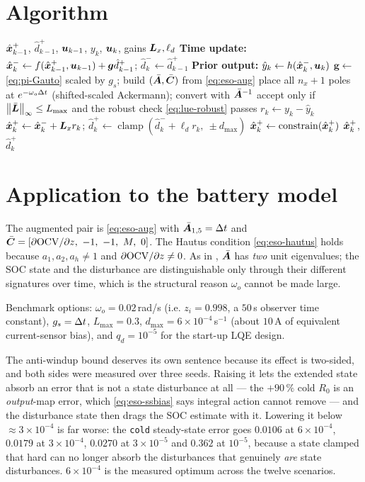 \section{Algorithm}
\begin{algorithm}[H]
\caption{ESO --- one sampling period}
\begin{algorithmic}[1]
\Require $\hat{\bm{x}}^{+}_{k-1}$, $\hat{d}^+_{k-1}$, $\bm{u}_{k-1}$, $y_k$, $\bm{u}_k$, gains $\bm{L}_x,\ell_d$
\State \textbf{Time update:} $\hat{\bm{x}}^{-}_k \gets f(\hat{\bm{x}}^{+}_{k-1},\bm{u}_{k-1}) + \bm{g}\hat{d}^+_{k-1}$; \quad $\hat{d}^-_k \gets \hat{d}^+_{k-1}$
\State \textbf{Prior output:} $\hat{y}_k \gets h(\hat{\bm{x}}^{-}_k,\bm{u}_k)$
  \State $\bm{g}\gets$ \eqref{eq:pi-Gauto} scaled by $g_s$; build $(\bar{\bm{A}},\bar{\bm{C}})$ from \eqref{eq:eso-aug}
  \State place all $n_x+1$ poles at $e^{-\omega_o\Delta t}$ (shifted-scaled Ackermann); convert with $\bar{\bm{A}}^{-1}$
  \State accept only if $\left\lVert \bar{\bm{L}} \right\rVert_\infty\le L_{\max}$ and the robust check \eqref{eq:lue-robust} passes
\EndIf
\State $r_k \gets y_k - \hat{y}_k$
\State $\hat{\bm{x}}^{+}_k \gets \hat{\bm{x}}^{-}_k + \bm{L}_x r_k$; \quad $\hat{d}^+_k \gets \operatorname{clamp}(\hat{d}^-_k + \ell_d r_k,\ \pm d_{\max})$
\State $\hat{\bm{x}}^{+}_k \gets \operatorname{constrain}(\hat{\bm{x}}^{+}_k)$
\Ensure $\hat{\bm{x}}^{+}_k$, $\hat{d}^+_k$
\end{algorithmic}
\end{algorithm}

\section{Application to the battery model}
The augmented pair is \eqref{eq:eso-aug} with
$\bar{\bm{A}}_{1,5} = \Delta t$ and $\bar{\mC} = [\partial\ocv/\partial\soc,\ -1,\ -1,\ M,\ 0]$.  The
Hautus condition \eqref{eq:eso-hautus} holds because $a_1,a_2,a_h\neq1$ and
$\partial\mathrm{OCV}/\partial z \neq 0$.  As in , $\bar{\bm{A}}$ has \emph{two} unit
eigenvalues; the SOC state and the disturbance are distinguishable only through their different
signatures over time, which is the structural reason $\omega_o$ cannot be made large.

Benchmark options: $\omega_o = 0.02$\,rad/s (i.e. $z_i = 0.998$, a $50$\,s observer time
constant), $g_s = \Delta t$, $L_{\max}=0.3$, $d_{\max}=6\times10^{-4}$\,s$^{-1}$ (about $10$\,A
of equivalent current-sensor bias), and $q_d = 10^{-5}$ for the start-up LQE design.

The anti-windup bound deserves its own sentence because its effect is two-sided, and both sides
were measured over three seeds.  Raising it lets the extended state absorb an error that is not a
state disturbance at all --- the $+90\,\%$ cold $R_0$ is an \emph{output}-map error, which
\eqref{eq:eso-ssbias} says integral action cannot remove --- and the disturbance state then drags
the SOC estimate with it.  Lowering it below $\approx3\times10^{-4}$ is far worse: the
\texttt{cold} steady-state error goes $0.0106$ at $6\times10^{-4}$, $0.0179$ at
$3\times10^{-4}$, $0.0270$ at $3\times10^{-5}$ and $0.362$ at $10^{-5}$, because a state clamped
that hard can no longer absorb the disturbances that genuinely \emph{are} state disturbances.
$6\times10^{-4}$ is the measured optimum across the twelve scenarios.

